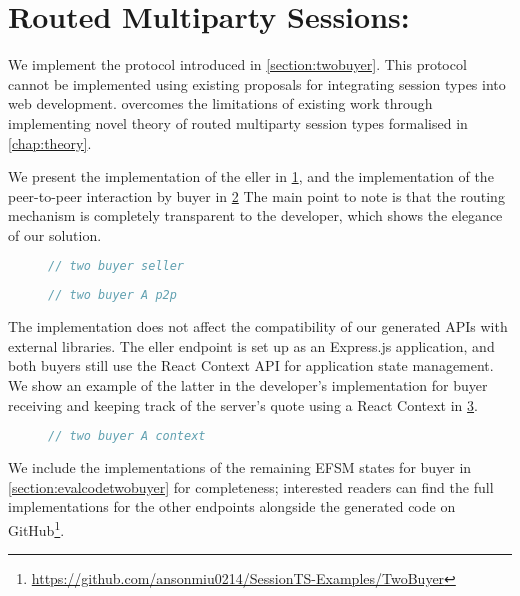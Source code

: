 \section{Routed Multiparty Sessions: }
\label{section:evaltwobuyer}

We implement the  protocol
introduced in \cref{section:twobuyer}. 
This protocol cannot be implemented using
existing proposals \cite{PureScript2019,MVU2020} for integrating
session types into web development.
\codegen overcomes the limitations of existing work
through implementing novel theory of routed multiparty
session types formalised in \cref{chap:theory}.

We present the implementation of the eller
in \cref{lst:evaltwobuyerseller}, 
and the implementation
of the peer-to-peer interaction by buyer 
in \cref{lst:evaltwobuyerA}
The main point to note is that the routing mechanism
is completely transparent to the developer,
which shows the elegance of our solution.

\begin{figure}[!h]
\begin{lstlisting}[language=javascript]
// two buyer seller
\end{lstlisting}
\label{lst:evaltwobuyerseller}
\end{figure}

\begin{figure}[!h]
\begin{lstlisting}[language=javascript]
// two buyer A p2p
\end{lstlisting}
\label{lst:evaltwobuyerA}
\end{figure}

The \newtheory implementation does not affect
the compatibility of our generated APIs with external libraries.
The eller endpoint is set up as an Express.js
application, and both buyers still use the React Context API
for application state management. We show an example of
the latter in the developer's implementation for
buyer  receiving and keeping track of the server's quote
using a React Context in \cref{lst:evaltwobuyercontext}.

\begin{figure}[!h]
\begin{lstlisting}[language=javascript]
// two buyer A context
\end{lstlisting}
\label{lst:evaltwobuyercontext}
\end{figure}

We include the implementations of the remaining EFSM states
for buyer  in \cref{section:evalcodetwobuyer}
for completeness;
interested readers can find the full implementations for the other
endpoints alongside the generated code on
GitHub\footnote{
\url{https://github.com/ansonmiu0214/SessionTS-Examples/TwoBuyer}
}.
